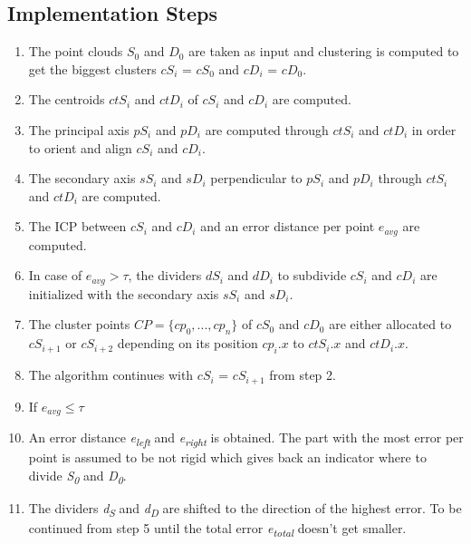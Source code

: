 \documentclass[notitlepage,english]{report}
\begin{document}
\subsection{Implementation Steps}

\begin{enumerate}
	\item The point clouds $S_0$ and $D_0$ are taken as input and clustering is computed to get the biggest clusters $cS_i$ = $cS_0$ and $cD_i$ = $cD_0$.
	
	\item The centroids $ctS_i$ and $ctD_i$ of $cS_i$ and $cD_i$ are computed.
	
	\item The principal axis $pS_i$ and $pD_i$ are computed through $ctS_i$ and $ctD_i$ in order to orient and align $cS_i$ and $cD_i$.
	
	\item The secondary axis $sS_i$ and $sD_i$ perpendicular to $pS_i$ and $pD_i$ through $ctS_i$ and $ctD_i$ are computed.
	
	\item The ICP between $cS_i$ and $cD_i$ and an error distance per point $e_{avg}$ are computed. 
	
	\item In case of $e_{avg} > \tau$, the dividers $dS_i$ and $dD_i$ to subdivide $cS_i$ and $cD_i$ are initialized with the secondary axis $sS_i$ and $sD_i$.
	
	\item The cluster points $ CP =  \{ {cp_0, ..., cp_n}\}$ of $cS_0$ and $cD_0$  are either allocated to $cS_{i + 1}$ or $cS_{i + 2}$ depending on its position $cp_i.x$ to $ctS_i.x$ and $ctD_i.x$. 
	
	\item The algorithm continues with $cS_i$ = $cS_{i + 1}$ from step 2.
	
	\item If $e_{avg} \le \tau$
	
	\item An error distance \textit{e\textsubscript{left}} and \textit{e\textsubscript{right}} is obtained. The part with the most error per point is assumed to be not rigid which gives back an indicator where to divide \textit{S\textsubscript{0}} and \textit{D\textsubscript{0}}.
	
	\item The dividers \textit{d\textsubscript{S}} and \textit{d\textsubscript{D}} are shifted to the direction of the highest error. To be continued from step 5 until the total error \textit{e\textsubscript{total}} doesn't get smaller.
\end{enumerate}
\end{document}
